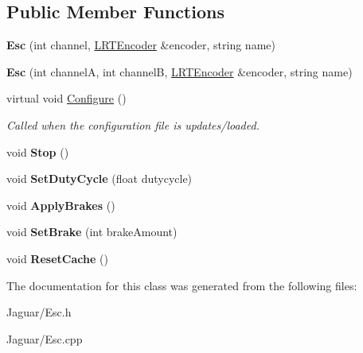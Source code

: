 \subsection*{\-Public \-Member \-Functions}
\begin{DoxyCompactItemize}
\item 
\hypertarget{class_esc_aa7c2ba2ac4f2d85a8208a1a5233fb4c9}{
{\bfseries \-Esc} (int channel, \hyperlink{class_l_r_t_encoder}{\-L\-R\-T\-Encoder} \&encoder, string name)}
\label{class_esc_aa7c2ba2ac4f2d85a8208a1a5233fb4c9}

\item 
\hypertarget{class_esc_ac12ce7d2797435669faa0385d926da03}{
{\bfseries \-Esc} (int channel\-A, int channel\-B, \hyperlink{class_l_r_t_encoder}{\-L\-R\-T\-Encoder} \&encoder, string name)}
\label{class_esc_ac12ce7d2797435669faa0385d926da03}

\item 
\hypertarget{class_esc_a68d0f30772baf6f0b20edd35143c641c}{
virtual void \hyperlink{class_esc_a68d0f30772baf6f0b20edd35143c641c}{\-Configure} ()}
\label{class_esc_a68d0f30772baf6f0b20edd35143c641c}

\begin{DoxyCompactList}\small\item\em \-Called when the configuration file is updates/loaded. \end{DoxyCompactList}\item 
\hypertarget{class_esc_a9fa344ee3919d8ef648afde0a5293e41}{
void {\bfseries \-Stop} ()}
\label{class_esc_a9fa344ee3919d8ef648afde0a5293e41}

\item 
\hypertarget{class_esc_a8d25275eb5049a2c07adaef48c8289c0}{
void {\bfseries \-Set\-Duty\-Cycle} (float dutycycle)}
\label{class_esc_a8d25275eb5049a2c07adaef48c8289c0}

\item 
\hypertarget{class_esc_a0f9303e993158962cf8dc3c7984be592}{
void {\bfseries \-Apply\-Brakes} ()}
\label{class_esc_a0f9303e993158962cf8dc3c7984be592}

\item 
\hypertarget{class_esc_a17ad62ceb63d917b00bc3ef4e50e3b61}{
void {\bfseries \-Set\-Brake} (int brake\-Amount)}
\label{class_esc_a17ad62ceb63d917b00bc3ef4e50e3b61}

\item 
\hypertarget{class_esc_a83732560f58e3515a7f81387312ad932}{
void {\bfseries \-Reset\-Cache} ()}
\label{class_esc_a83732560f58e3515a7f81387312ad932}

\end{DoxyCompactItemize}


\-The documentation for this class was generated from the following files\-:\begin{DoxyCompactItemize}
\item 
\-Jaguar/\-Esc.\-h\item 
\-Jaguar/\-Esc.\-cpp\end{DoxyCompactItemize}
